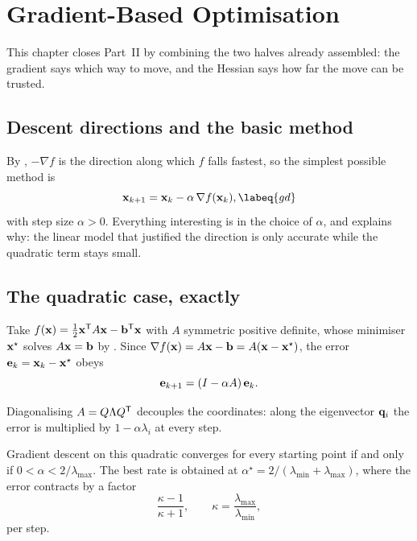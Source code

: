 \setchapterpreamble[u]{\margintoc}
\chapter{Gradient-Based Optimisation}


This chapter closes Part~II by combining the two halves already assembled: the
gradient says which way to move, and the Hessian says how far the move can be
trusted.

\section{Descent directions and the basic method}

By , \(-\nabla f\) is the direction along which \(f\) falls
fastest, so the simplest possible method is
\begin{equation}
	\vect{x}_{k+1}=\vect{x}_k-\alpha\,\nabla f(\vect{x}_k),
	\labeq{gd}
\end{equation}
with step size \(\alpha>0\). Everything interesting is in the choice of
\(\alpha\), and \refeq{taylor2} explains why: the linear model that justified the
direction is only accurate while the quadratic term stays small.

\section{The quadratic case, exactly}

Take \(f(\mathbf{x})=\tfrac12\mathbf{x}^{\mathsf{T}} A\mathbf{x}-\mathbf{b}^{\mathsf{T}}\mathbf{x}\) with \(A\)
symmetric positive definite, whose minimiser \(\mathbf{x}^{\star}\) solves
\(A\mathbf{x}=\mathbf{b}\) by \refsec{quadratic-forms}. Since
\(\nabla f(\mathbf{x})=A\mathbf{x}-\mathbf{b}=A(\mathbf{x}-\mathbf{x}^{\star})\), the error
\(\mathbf{e}_k=\mathbf{x}_k-\mathbf{x}^{\star}\) obeys
\[
	\mathbf{e}_{k+1}=(I-\alpha A)\,\mathbf{e}_k .
\]

Diagonalising \(A=Q\Lambda Q^{\mathsf{T}}\) decouples the coordinates: along the
eigenvector \(\mathbf{q}_i\) the error is multiplied by \(1-\alpha\lambda_i\) at
every step.

\begin{theorem}
Gradient descent on this quadratic converges for every starting point if and
only if \(0<\alpha<2/\lambda_{\max}\). The best rate is obtained at
\(\alpha^{\star}=2/(\lambda_{\min}+\lambda_{\max})\), where the error contracts
by a factor
\[
	\frac{\kappa-1}{\kappa+1},
	\qquad
	\kappa=\frac{\lambda_{\max}}{\lambda_{\min}},
\]
per step.
\end{theorem}

